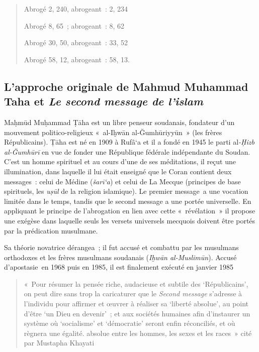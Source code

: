 \begin{quote}
Abrogé 2, 240, abrogeant~: 2, 234

Abrogé 8, 65~; abrogeant~: 8, 62

Abrogé 30, 50, abrogeant~: 33, 52

Abrogé 58, 12, abrogeant~: 58, 13.
\end{quote}


\subsection{ L'approche originale de Mahmud Muhammad Taha et \emph{Le
second message de l'islam}}

Maḥmūd Muḥammad Ṭāha est un libre penseur soudanais, fondateur d'un
mouvement politico-religieux «~al-Iḫwān al-Ğumhūriyyūn~» (les frères
Républicains). Ṭāha est né en 1909 à Rufâ`a et il a fondé en 1945 le
parti al\emph{-Ḥizb al-Ğumhūrī} en vue de fonder une République fédérale
indépendante du Soudan. C'est un homme spirituel et au cours d'une de
ses méditations, il reçut une illumination, dans laquelle il lui était
enseigné que le Coran contient deux messages~: celui de Médine
(\emph{šarī`a}) et celui de La Mecque (principes de base spirituels, les
\emph{uṣūl} de la religion islamique). Le premier message~a une vocation
limitée dans le temps, tandis que le second message a une portée
universelle. En appliquant le principe de l'abrogation en lien avec
cette «~révélation~» il propose une exégèse dans laquelle seuls les
versets universels mecquois doivent être portés par la prédication
musulmane.

Sa théorie novatrice dérangea~; il fut accusé et combattu par les
musulmans orthodoxes et les frères musulmans soudanais (\emph{Iḫwān
al-Muslimūn}). Accusé d'apostasie~en 1968 puis en 1985, il est
finalement exécuté en janvier 1985

\begin{quote}
     «~Pour résumer la pensée riche, audacieuse et subtile des
  `Républicains', on peut dire sans trop la caricaturer que le
  \emph{Second message} s'adresse à l'individu pour affirmer et œuvrer à
  réaliser sa `liberté absolue', au point d'être `un Dieu en devenir'~;
  et aux sociétés humaines afin d'instaurer un système où `socialisme'
  et `démocratie' seront enfin réconciliés, et où règnera une égalité.
  absolue entre les hommes, les sexes et les races~» cité par Mustapha Khayati
\end{quote}
 

